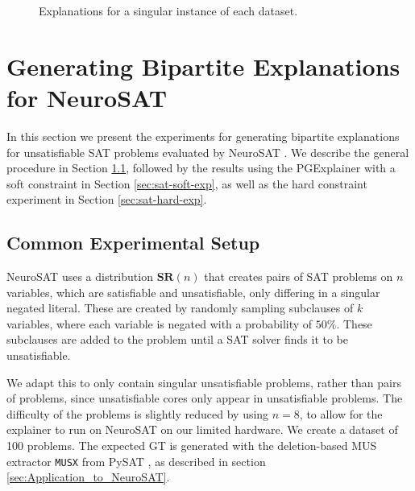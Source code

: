 \begin{figure}[h]
    \caption{Explanations for a singular instance of each dataset.}
    \label{fig:qual_expl}
\end{figure}





\section{Generating Bipartite Explanations for NeuroSAT}
\label{sec:SAT-experiments}

In this section we present the experiments for generating bipartite explanations for unsatisfiable SAT problems evaluated by NeuroSAT \cite{selsam2018learning}. We describe the general procedure in Section \ref{sec:SAT-exp-setup}, followed by the results using the PGExplainer with a soft constraint in Section \ref{sec:sat-soft-exp}, as well as the hard constraint experiment in Section \ref{sec:sat-hard-exp}.

\subsection{Common Experimental Setup}
\label{sec:SAT-exp-setup}

NeuroSAT \cite{selsam2018learning} uses a distribution $\textbf{SR}(n)$ that creates pairs of SAT problems on $n$ variables, which are satisfiable and unsatisfiable, only differing in a singular negated literal. These are created by randomly sampling subclauses of $k$ variables, where each variable is negated with a probability of $50\%$. These subclauses are added to the problem until a SAT solver \cite{een2003extensible} finds it to be unsatisfiable. 

We adapt this to only contain singular unsatisfiable problems, rather than pairs of problems, since unsatisfiable cores only appear in unsatisfiable problems. The difficulty of the problems is slightly reduced by using $n=8$, to allow for the explainer to run on NeuroSAT on our limited hardware. We create a dataset of 100 problems. The expected \ac{GT} is generated with the deletion-based MUS extractor \lstinline|MUSX| from PySAT \cite{imms-sat18}, as described in section \ref{sec:Application_to_NeuroSAT}. \bigskip

